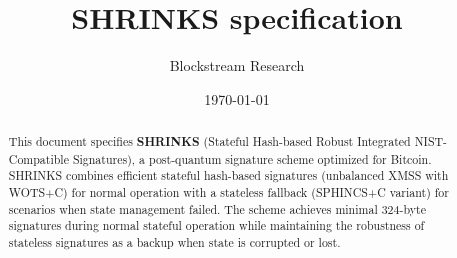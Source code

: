 \documentclass[10pt, a4paper]{article}
\title{SHRINKS specification}
\author{Blockstream Research}
\date{\today}
\begin{document}
\maketitle

\begin{abstract}
  This document specifies \textbf{SHRINKS} (Stateful Hash-based Robust Integrated NIST-Compatible 
  Signatures), a post-quantum signature scheme optimized for Bitcoin. SHRINKS combines efficient stateful 
  hash-based signatures (unbalanced XMSS with WOTS+C) for normal operation with a stateless fallback 
  (SPHINCS+C variant) for scenarios when state management failed. The scheme achieves minimal 324-byte signatures 
  during normal stateful operation while maintaining the robustness of stateless signatures as a 
  backup when state is corrupted or lost.
\end{abstract}







\printbibliography{}

\appendix


\end{document}
